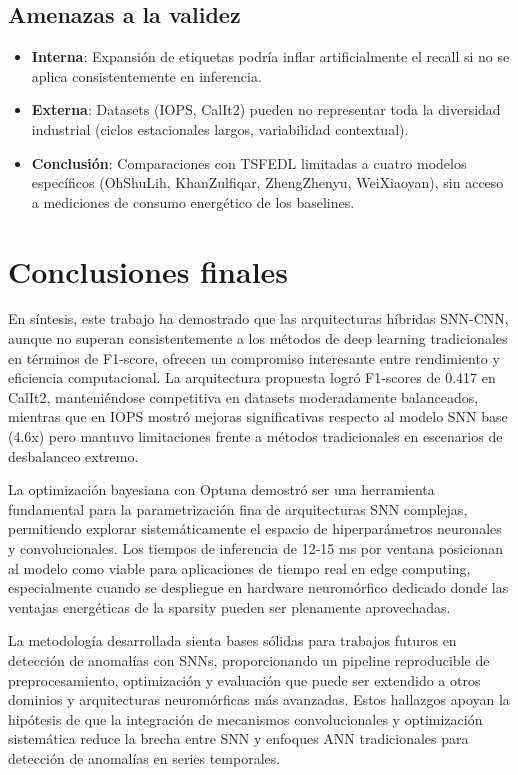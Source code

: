 \subsection{Amenazas a la validez}
\begin{itemize}
    \item \textbf{Interna}: Expansión de etiquetas podría inflar artificialmente el recall si no se aplica consistentemente en inferencia.
    \item \textbf{Externa}: Datasets (IOPS, CalIt2) pueden no representar toda la diversidad industrial (ciclos estacionales largos, variabilidad contextual).
    \item \textbf{Conclusión}: Comparaciones con TSFEDL limitadas a cuatro modelos específicos (OhShuLih, KhanZulfiqar, ZhengZhenyu, WeiXiaoyan), sin acceso a mediciones de consumo energético de los baselines.
\end{itemize}

\section{Conclusiones finales}
En síntesis, este trabajo ha demostrado que las arquitecturas híbridas SNN-CNN, aunque no superan consistentemente a los métodos de deep learning tradicionales en términos de F1-score, ofrecen un compromiso interesante entre rendimiento y eficiencia computacional. La arquitectura propuesta logró F1-scores de 0.417 en CalIt2, manteniéndose competitiva en datasets moderadamente balanceados, mientras que en IOPS mostró mejoras significativas respecto al modelo SNN base (4.6x) pero mantuvo limitaciones frente a métodos tradicionales en escenarios de desbalanceo extremo.

La optimización bayesiana con Optuna demostró ser una herramienta fundamental para la parametrización fina de arquitecturas SNN complejas, permitiendo explorar sistemáticamente el espacio de hiperparámetros neuronales y convolucionales. Los tiempos de inferencia de 12-15 ms por ventana posicionan al modelo como viable para aplicaciones de tiempo real en edge computing, especialmente cuando se despliegue en hardware neuromórfico dedicado donde las ventajas energéticas de la sparsity pueden ser plenamente aprovechadas.

La metodología desarrollada sienta bases sólidas para trabajos futuros en detección de anomalías con SNNs, proporcionando un pipeline reproducible de preprocesamiento, optimización y evaluación que puede ser extendido a otros dominios y arquitecturas neuromórficas más avanzadas.
Estos hallazgos apoyan la hipótesis de que la integración de mecanismos convolucionales y optimización sistemática reduce la brecha entre SNN y enfoques ANN tradicionales para detección de anomalías en series temporales.

